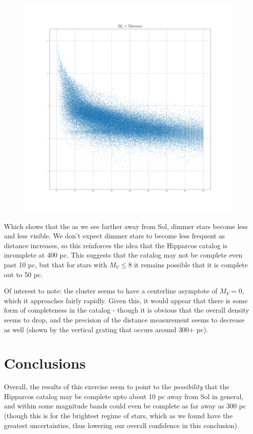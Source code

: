\documentclass{business-covered} %
\begin{document}
		\begin{figure}[h!]
			\includegraphics[scale=.33]{figures/dist_mag.png}
		\end{figure}
\pagebreak
		Which shows that the as we see farther away from Sol, dimmer stars become less and less visible. We don't expect dimmer stars to become less frequent as distance increases, so this reinforces the idea that the Hipparcos catalog is incomplete at 400 pc. This suggests that the catalog may not be complete even past 10 pc, but that for stars with $M_V\le 8$ it remains possible that it is complete out to 50 pc.
		
		Of interest to note: the cluster seems to have a centerline asymptote of $M_V=0$, which it approaches fairly rapidly. Given this, it would appear that there is some form of completeness in the catalog - though it is obvious that the overall density seems to drop, and the precision of the distance measurement seems to decrease as well (shown by the vertical grating that occurs around 300+ pc). 
		
		
\pagebreak
	\section{Conclusions}
		
		Overall, the results of this exercise seem to point to the \textit{possibility} that the Hipparcos catalog may be complete upto about 10 pc away from Sol in general, and within some magnitude bands could even be complete as far away as 300 pc (though this is for the brightest regime of stars, which as we found have the greatest uncertainties, thus lowering our overall confidence in this conclusion).
		
\end{document}
